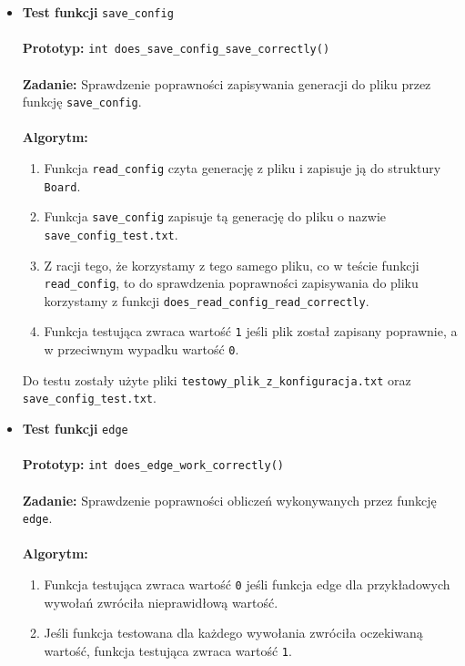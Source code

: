 \documentclass[12pt,a4paper,notitlepage]{report}
\begin{document}
\begin{itemize}
	\item\textbf {Test funkcji} \verb|save_config|\\
	\\
	\textbf{Prototyp:} \verb|int does_save_config_save_correctly()|\\
	\\
	\textbf{Zadanie:} Sprawdzenie poprawności zapisywania generacji do pliku przez funkcję \verb|save_config|.\\
	\\
	\textbf{Algorytm:}
	\begin{enumerate}
		\item Funkcja \verb|read_config| czyta generację z pliku i zapisuje ją do struktury \verb|Board|.
		\item Funkcja \verb|save_config| zapisuje tą generację do pliku o nazwie \verb|save_config_test.txt|.
		\item Z racji tego, że korzystamy z tego samego pliku, co w teście funkcji \verb|read_config|, to do sprawdzenia poprawności zapisywania do pliku korzystamy z funkcji \verb|does_read_config_read_correctly|.
		\item Funkcja testująca zwraca wartość \verb|1| jeśli plik został zapisany poprawnie, a w przeciwnym wypadku wartość \verb|0|.
	\end{enumerate}

		Do testu zostały użyte pliki \verb|testowy_plik_z_konfiguracja.txt| oraz \verb|save_config_test.txt|.\\
		
	\item\textbf {Test funkcji} \verb|edge|\\
	\\
	\textbf{Prototyp:} \verb|int does_edge_work_correctly()|\\
	\\
	\textbf{Zadanie:} Sprawdzenie poprawności obliczeń wykonywanych przez funkcję \verb|edge|.\\
	\\
	\textbf{Algorytm:}
	\begin{enumerate}
	\item Funkcja testująca zwraca wartość \verb|0| jeśli funkcja edge dla przykładowych wywołań zwróciła nieprawidłową wartość.
	\item Jeśli funkcja testowana dla każdego wywołania zwróciła oczekiwaną wartość, funkcja testująca zwraca wartość \verb|1|.
	\end{enumerate}



\end{itemize}
\end{document}
